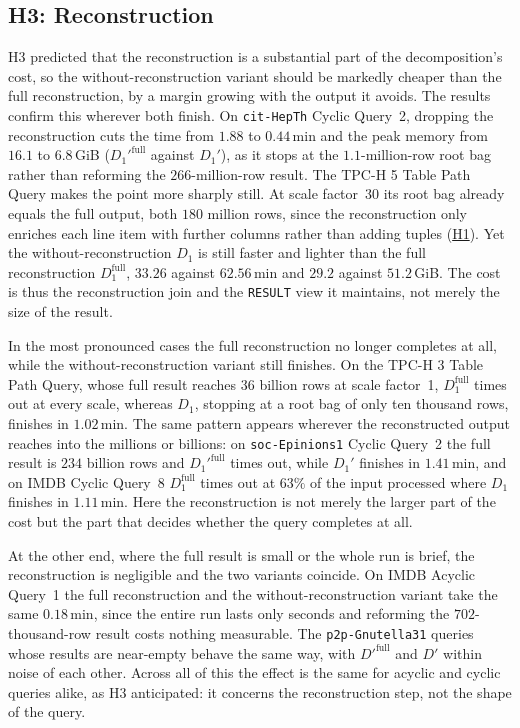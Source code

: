 \subsection{H3: Reconstruction}
\label{sec:disc_h3}

H3 predicted that the reconstruction is a substantial part of the decomposition's cost, so the without-reconstruction variant should be markedly cheaper than the full reconstruction, by a margin growing with the output it avoids. The results confirm this wherever both finish. On \texttt{cit-HepTh} Cyclic Query~2, dropping the reconstruction cuts the time from $1.88$ to $0.44$\,min and the peak memory from $16.1$ to $6.8$\,GiB ($D_1'^{\text{full}}$ against $D_1'$), as it stops at the $1.1$-million-row root bag rather than reforming the $266$-million-row result. The TPC-H 5 Table Path Query makes the point more sharply still. At scale factor~30 its root bag already equals the full output, both $180$ million rows, since the reconstruction only enriches each line item with further columns rather than adding tuples (\hyperlink{h1}{H1}). Yet the without-reconstruction $D_1$ is still faster and lighter than the full reconstruction $D_1^{\text{full}}$, $33.26$ against $62.56$\,min and $29.2$ against $51.2$\,GiB. The cost is thus the reconstruction join and the \texttt{RESULT} view it maintains, not merely the size of the result.

In the most pronounced cases the full reconstruction no longer completes at all, while the without-reconstruction variant still finishes. On the TPC-H 3 Table Path Query, whose full result reaches $36$ billion rows at scale factor~1, $D_1^{\text{full}}$ times out at every scale, whereas $D_1$, stopping at a root bag of only ten thousand rows, finishes in $1.02$\,min. The same pattern appears wherever the reconstructed output reaches into the millions or billions: on \texttt{soc-Epinions1} Cyclic Query~2 the full result is $234$ billion rows and $D_1'^{\text{full}}$ times out, while $D_1'$ finishes in $1.41$\,min, and on IMDB Cyclic Query~8 $D_1^{\text{full}}$ times out at $63\%$ of the input processed where $D_1$ finishes in $1.11$\,min. Here the reconstruction is not merely the larger part of the cost but the part that decides whether the query completes at all.

At the other end, where the full result is small or the whole run is brief, the reconstruction is negligible and the two variants coincide. On IMDB Acyclic Query~1 the full reconstruction and the without-reconstruction variant take the same $0.18$\,min, since the entire run lasts only seconds and reforming the $702$-thousand-row result costs nothing measurable. The \texttt{p2p-Gnutella31} queries whose results are near-empty behave the same way, with $D'^{\text{full}}$ and $D'$ within noise of each other. Across all of this the effect is the same for acyclic and cyclic queries alike, as H3 anticipated: it concerns the reconstruction step, not the shape of the query.

